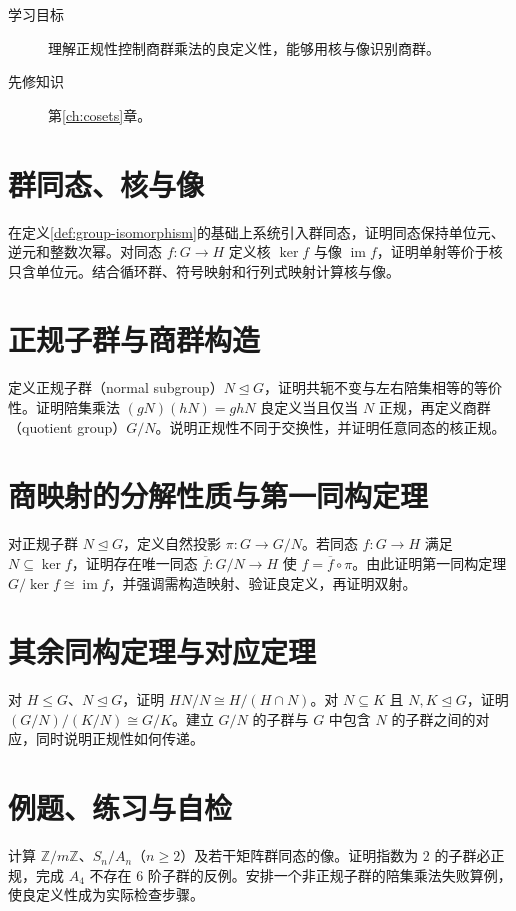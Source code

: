 \documentclass[UTF8,12pt,a4paper,fontset=fandol]{ctexbook}
\begin{document}
\begin{description}
  \item[学习目标] 理解正规性控制商群乘法的良定义性，能够用核与像识别商群。
  \item[先修知识] 第\ref{ch:cosets}章。
\end{description}

\section{群同态、核与像}
在定义\ref{def:group-isomorphism}的基础上系统引入群同态，证明同态保持单位元、逆元和整数次幂。对同态 $f:G\to H$ 定义核 $\ker f$ 与像 $\operatorname{im}f$，证明单射等价于核只含单位元。结合循环群、符号映射和行列式映射计算核与像。

\section{正规子群与商群构造}
定义正规子群（normal subgroup）$N\trianglelefteq G$，证明共轭不变与左右陪集相等的等价性。证明陪集乘法 $(gN)(hN)=ghN$ 良定义当且仅当 $N$ 正规，再定义商群（quotient group）$G/N$。说明正规性不同于交换性，并证明任意同态的核正规。

\section{商映射的分解性质与第一同构定理}
对正规子群 $N\trianglelefteq G$，定义自然投影 $\pi:G\to G/N$。若同态 $f:G\to H$ 满足 $N\subseteq\ker f$，证明存在唯一同态 $\overline f:G/N\to H$ 使 $f=\overline f\circ\pi$。由此证明第一同构定理 $G/\ker f\cong\operatorname{im}f$，并强调需构造映射、验证良定义，再证明双射。

\section{其余同构定理与对应定理}
对 $H\leq G$、$N\trianglelefteq G$，证明 $HN/N\cong H/(H\cap N)$。对 $N\subseteq K$ 且 $N,K\trianglelefteq G$，证明 $(G/N)/(K/N)\cong G/K$。建立 $G/N$ 的子群与 $G$ 中包含 $N$ 的子群之间的对应，同时说明正规性如何传递。

\section{例题、练习与自检}
计算 $\mathbb Z/m\mathbb Z$、$S_n/A_n$（$n\geq2$）及若干矩阵群同态的像。证明指数为 $2$ 的子群必正规，完成 $A_4$ 不存在 $6$ 阶子群的反例。安排一个非正规子群的陪集乘法失败算例，使良定义性成为实际检查步骤。
\end{document}
